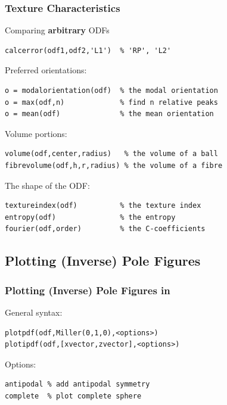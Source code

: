 \begin{frame}[fragile]
  \frametitle{Texture Characteristics}

Comparing {\bf arbitrary} ODFs
\begin{lstlisting}
calcerror(odf1,odf2,'L1')  % 'RP', 'L2'
\end{lstlisting}


\pause

Preferred orientations:
\begin{lstlisting}
o = modalorientation(odf)  % the modal orientation
o = max(odf,n)             % find n relative peaks
o = mean(odf)              % the mean orientation
\end{lstlisting}


\pause

Volume portions:
\begin{lstlisting}
volume(odf,center,radius)   % the volume of a ball
fibrevolume(odf,h,r,radius) % the volume of a fibre
\end{lstlisting}

\pause

The shape of the ODF:
\begin{lstlisting}
textureindex(odf)          % the texture index
entropy(odf)               % the entropy
fourier(odf,order)         % the C-coefficients
\end{lstlisting}


\end{frame}


\subsection*{Plotting (Inverse) Pole Figures}

\begin{frame}[fragile]
  \frametitle{Plotting (Inverse) Pole Figures in \MTEX}

  General syntax:
\begin{lstlisting}
plotpdf(odf,Miller(0,1,0),<options>)
plotipdf(odf,[xvector,zvector],<options>)
\end{lstlisting}

Options:
\begin{lstlisting}
antipodal % add antipodal symmetry
complete  % plot complete sphere
\end{lstlisting}



\end{frame}


